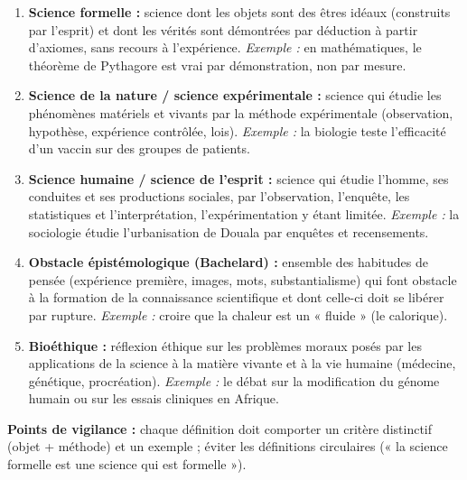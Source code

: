 \documentclass[11pt]{article}
\newcommand{\cle}[1]{{\popxbold\color{popdark}#1}}
\begin{document}
\begin{corrige}
\begin{enumerate}
    \item \textbf{Science formelle :} science dont les objets sont des \cle{êtres idéaux} (construits par l'esprit) et dont les vérités sont démontrées par \cle{déduction} à partir d'axiomes, sans recours à l'expérience. \emph{Exemple :} en mathématiques, le théorème de Pythagore est vrai par démonstration, non par mesure.
    \item \textbf{Science de la nature / science expérimentale :} science qui étudie les phénomènes matériels et vivants par la \cle{méthode expérimentale} (observation, hypothèse, expérience contrôlée, lois). \emph{Exemple :} la biologie teste l'efficacité d'un vaccin sur des groupes de patients.
    \item \textbf{Science humaine / science de l'esprit :} science qui étudie l'homme, ses conduites et ses productions sociales, par l'observation, l'enquête, les statistiques et l'interprétation, l'expérimentation y étant limitée. \emph{Exemple :} la sociologie étudie l'urbanisation de Douala par enquêtes et recensements.
    \item \textbf{Obstacle épistémologique (Bachelard) :} ensemble des habitudes de pensée (expérience première, images, mots, substantialisme) qui font obstacle à la formation de la connaissance scientifique et dont celle-ci doit se libérer par rupture. \emph{Exemple :} croire que la chaleur est un « fluide » (le calorique).
    \item \textbf{Bioéthique :} réflexion éthique sur les problèmes moraux posés par les applications de la science à la matière vivante et à la vie humaine (médecine, génétique, procréation). \emph{Exemple :} le débat sur la modification du génome humain ou sur les essais cliniques en Afrique.
\end{enumerate}
\textbf{Points de vigilance :} chaque définition doit comporter un critère distinctif (objet + méthode) et un exemple ; éviter les définitions circulaires (« la science formelle est une science qui est formelle »).
\end{corrige}
\end{document}
